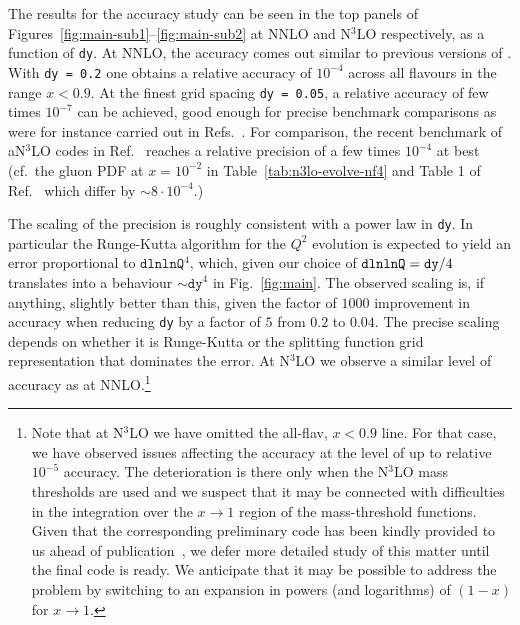 The results for the accuracy study can be seen in the top panels of
Figures~\ref{fig:main-sub1}--\ref{fig:main-sub2} at NNLO and N$^3$LO
respectively, as a function of \texttt{dy}.
%
At NNLO, the accuracy comes out similar to previous
versions of \hoppet.
%
With \texttt{dy =
  0.2} one obtains a relative accuracy of $10^{-4}$ across all
flavours in the range $x < 0.9$.
%
At the finest grid spacing \texttt{dy = 0.05}, a relative accuracy of
few times $10^{-7}$ can be achieved, good enough for precise benchmark
comparisons as were for instance carried out in
Refs.~\cite{Dittmar:2005ed,Bertone:2024dpm}.
%
For comparison,
the recent benchmark of aN$^3$LO codes in
Ref.~\cite{Cooper-Sarkar:2024crx} reaches a relative precision of a
few times $10^{-4}$ at best (cf.\ the gluon PDF at $x = 10^{-2}$ in
Table~\ref{tab:n3lo-evolve-nf4} and Table 1 of
Ref.~\cite{Cooper-Sarkar:2024crx} which differ by $\sim 8\cdot 10^{-4}$.)

The scaling of the precision is roughly consistent with a power law in
\texttt{dy}.
%
In particular the Runge-Kutta algorithm for the $Q^2$ evolution is
expected to yield an error proportional to $\texttt{dlnlnQ}^4$, which,
given our choice of $\texttt{dlnlnQ} = \texttt{dy}/4$
translates into a behaviour $\sim \texttt{dy}^4$ in
Fig.~\ref{fig:main}.
%
The observed scaling is, if anything, slightly better than this, given
the factor of $1000$ improvement in accuracy when reducing \texttt{dy}
by a factor of $5$ from $0.2$ to $0.04$.
%
The precise scaling depends on whether it is Runge-Kutta or the
splitting function grid representation that dominates the error.
%
At N$^3$LO we observe a similar level of accuracy as at
NNLO.\footnote{Note that at N$^3$LO we have omitted the 
  all-flav, $x<0.9$ line.
  For that case, we have observed issues affecting the accuracy at the
  level of up to relative $10^{-5}$ accuracy.
  The deterioration is there only when the N$^3$LO mass thresholds are
  used and we suspect that it may be connected with difficulties in the
  integration over the $x \to 1$ region of the mass-threshold
  functions.
  Given that the corresponding preliminary code has been kindly
  provided to us ahead of publication~\cite{BlumleinCode}, we defer
  more detailed study of this matter until the final code is ready.
  We anticipate that it may be possible to address the problem by
  switching to an expansion in powers (and logarithms) of $(1-x)$ for
  $x \to 1$.  }



